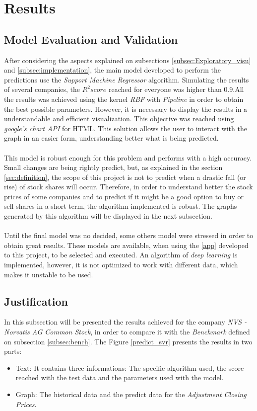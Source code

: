 \section{Results}
\label{sec:results}

\subsection{Model Evaluation and Validation}
After considering the aspects explained on subsections \ref{subsec:Exploratory_visu} and \ref{subsec:implementation}, the main model developed to perform the predictions use the \textit{Support Machine Regressor} algorithm.
Simulating the results of several companies, the $R^2 score$ reached for everyone was higher than 0.9.All the results was achieved using the kernel \textit{RBF} with \textit{Pipeline} in order to obtain the best possible parameters.
However, it is necessary to display the results in a understandable and efficient visualization. This objective was reached using \textit{google's chart API} for HTML. This solution allows the user to interact with the graph in an easier
form, understanding better what is being predicted.\\
\\
This model is robust enough for this problem and performs with a high accuracy. Small changes are being rightly predict, but, as explained in the section \ref{sec:definition}, the scope of this project is not to predict when a drastic fall
(or rise) of stock shares will occur. Therefore, in order to understand better the stock prices of some companies and to predict if it might be a good option to buy or sell shares in a short term, the algorithm implemented is robust. The graphs generated by this algorithm will be displayed in the next subsection.\\
\\
Until the final model was no decided, some others model were stressed in order to obtain great results. These models are available, when using the \ref{app} developed to this project, to be selected and executed. An algorithm of \textit{deep learning} is implemented, however, it is not optimized to work with different data, which makes it unstable to be used.


\subsection{Justification}
In this subsection will be presented the results achieved for the company \textit{NVS - Norvatis AG Common Stock}, in order to compare it with the \textit{Benchmark} defined on subsection \ref{subsec:bench}.
The Figure \ref{predict_svr} presents the results in two parts: 
\begin{itemize}
	\item Text: It contains three informations: The specific algorithm used, the  score reached with the test data and the parameters used with the model.\\
	\item Graph: The historical data and the predict data for the \textit{Adjustment Closing Prices}.\\
\end{itemize}

